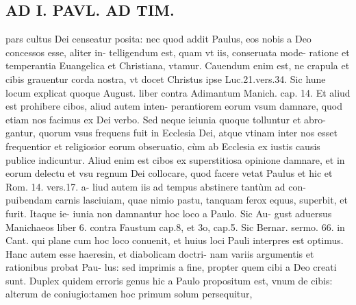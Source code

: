 \documentclass{article}
\begin{document}
\begin{pages}
\section*{AD I. PAVL. AD TIM. }
\marginpar{[ p.186 ]}\pstart pars cultus Dei censeatur posita: nec quod addit Paulus, eos nobis a Deo concessos esse, aliter in- telligendum est, quam vt iis, conseruata mode- ratione et temperantia Euangelica et Christiana, vtamur. Cauendum enim est, ne crapula et cibis grauentur corda nostra, vt docet Christus ipse Luc.21.vers.34. Sic hune locum explicat quoque August. liber  contra Adimantum Manich. cap. 14. Et aliud est prohibere cibos, aliud autem inten- perantiorem eorum vsum damnare, quod etiam nos facimus ex Dei verbo.  \pend\pstart Sed neque ieiunia quoque tolluntur et abro- gantur, quorum vsus frequens fuit in Ecclesia Dei, atque vtinam inter nos esset frequentior et religiosior eorum obseruatio, cùm ab Ecclesia ex iustis causis publice indicuntur. Aliud enim est cibos ex superstitiosa opinione damnare, et in eorum delectu et vsu regnum Dei collocare, quod facere vetat Paulus et hic et Rom. 14. vers.17. a- liud autem iis ad tempus abstinere tantùm ad con- puibendam carnis lasciuiam, quae nimio pastu, tanquam ferox equus, superbit, et furit. Itaque ie- iunia non damnantur hoc loco a Paulo. Sic Au- gust aduersus Manichaeos liber 6. contra Faustum cap.8, et 3o, cap.5. Sic Bernar. sermo. 66. in Cant. qui plane cum hoc loco conuenit, et huius loci Pauli interpres est optimus.  \pend\pstart Hanc autem esse haeresin, et diabolicam doctri- nam variis argumentis et rationibus probat Pau- lus: sed imprimis a fine, propter quem cibi a Deo creati sunt. Duplex quidem erroris genus hic a Paulo propositum est, vnum de cibis: alterum de coniugio:tamen hoc primum solum persequitur,  \pend

\end{pages}
\end{document}
